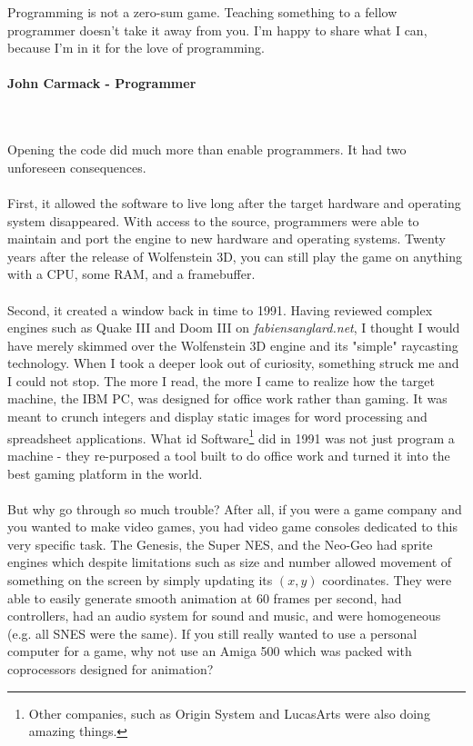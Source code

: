  \begin{fancyquotes}
   Programming is not a zero-sum game. Teaching something to a fellow programmer doesn't take it away from you. I'm happy to share what I can, because I'm in it for the love of programming.\\
   \\
\textbf{John Carmack - Programmer}
 \end{fancyquotes}\\
\\
Opening the code did much more than enable programmers. It had two unforeseen consequences.\\
\\
First, it allowed the software to live long after the target hardware and operating system disappeared. With access to the source, programmers were able to maintain and port the engine to new hardware and operating systems. Twenty years after the release of Wolfenstein 3D, you can still play the game on anything with a CPU, some RAM, and a framebuffer. \\
\\
Second, it created a window back in time to 1991. Having reviewed complex engines such as Quake III and Doom III on \emph{fabiensanglard.net}, I thought I would have merely skimmed over the Wolfenstein 3D engine and its "simple" raycasting technology. When I took a deeper look out of curiosity, something struck me and I could not stop. The more I read, the more I came to realize how the target machine, the IBM PC, was designed for office work rather than gaming. It was meant to crunch integers and display static images for word processing and spreadsheet applications. 
What id Software\footnote{Other companies, such as Origin System and LucasArts were also doing amazing things.} did in 1991 was not just program a machine - they re-purposed a tool built to do office work and turned it into the best gaming platform in the world.\\
\\
But why go through so much trouble? After all, if you were a game company and you wanted to make video games, you had video game consoles dedicated to this very specific task. The Genesis, the Super NES, and the Neo-Geo had sprite engines\label{sprite_engine_ref} which despite limitations such as size and number allowed movement of something on the screen by simply updating its $(x,y)$ coordinates. They were able to easily generate smooth animation at 60 frames per second, had controllers, had an audio system for sound and music, and were homogeneous (e.g. all SNES were the same). If you still really wanted to use a personal computer for a game, why not use an Amiga 500 which was packed with coprocessors designed for animation?\\

